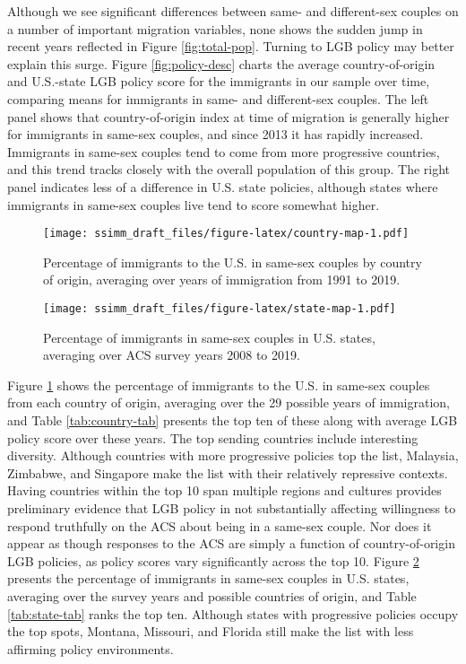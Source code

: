 \documentclass[
  11pt,
]{article}
\begin{document}
Although we see significant differences between same- and different-sex couples on a number of important migration variables, none shows the sudden jump in recent years reflected in Figure \ref{fig:total-pop}. Turning to LGB policy may better explain this surge. Figure \ref{fig:policy-desc} charts the average country-of-origin and U.S.-state LGB policy score for the immigrants in our sample over time, comparing means for immigrants in same- and different-sex couples. The left panel shows that country-of-origin index at time of migration is generally higher for immigrants in same-sex couples, and since 2013 it has rapidly increased. Immigrants in same-sex couples tend to come from more progressive countries, and this trend tracks closely with the overall population of this group. The right panel indicates less of a difference in U.S. state policies, although states where immigrants in same-sex couples live tend to score somewhat higher.

\begin{figure}
\centering
\texttt{[image: ssimm\_draft\_files/figure-latex/country-map-1.pdf]}
\caption{\label{fig:country-map}Percentage of immigrants to the U.S. in same-sex couples by country of origin, averaging over years of immigration from 1991 to 2019.}
\end{figure}

\begin{figure}
\centering
\texttt{[image: ssimm\_draft\_files/figure-latex/state-map-1.pdf]}
\caption{\label{fig:state-map}Percentage of immigrants in same-sex couples in U.S. states, averaging over ACS survey years 2008 to 2019.}
\end{figure}

Figure \ref{fig:country-map} shows the percentage of immigrants to the U.S. in same-sex couples from each country of origin, averaging over the 29 possible years of immigration, and Table \ref{tab:country-tab} presents the top ten of these along with average LGB policy score over these years. The top sending countries include interesting diversity. Although countries with more progressive policies top the list, Malaysia, Zimbabwe, and Singapore make the list with their relatively repressive contexts. Having countries within the top 10 span multiple regions and cultures provides preliminary evidence that LGB policy in not substantially affecting willingness to respond truthfully on the ACS about being in a same-sex couple. Nor does it appear as though responses to the ACS are simply a function of country-of-origin LGB policies, as policy scores vary significantly across the top 10. Figure \ref{fig:state-map} presents the percentage of immigrants in same-sex couples in U.S. states, averaging over the survey years and possible countries of origin, and Table \ref{tab:state-tab} ranks the top ten. Although states with progressive policies occupy the top spots, Montana, Missouri, and Florida still make the list with less affirming policy environments.
\end{document}
